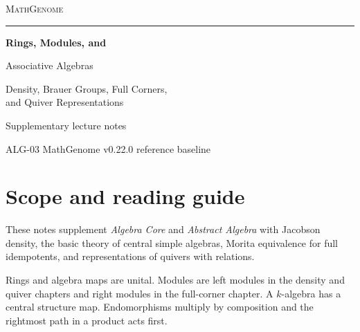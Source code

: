 \documentclass[11pt,oneside,openany]{book}
\theoremstyle{definition}
\theoremstyle{remark}
\begin{document}
\frontmatter
\hypersetup{pageanchor=false}
\begin{titlepage}
  \thispagestyle{empty}
  \begin{flushleft}
    \vspace*{0.65in}
    {\large\scshape\color{deepgreen}MathGenome\par}
    \vspace{0.32in}
    {\color{rulegreen}\rule{0.94\textwidth}{0.65pt}\par}
    \vspace{0.45in}
    {\color{ink}\fontsize{34}{39}\selectfont\bfseries
       Rings, Modules, and\par Associative Algebras\par}
    \vspace{0.30in}
    {\color{deepgreen}\Large
       Density, Brauer Groups, Full Corners,\\[3pt]
       and Quiver Representations\par}
    \vfill
    {\large Supplementary lecture notes\par}
    \vspace{0.12in}
    {\normalsize ALG-03 \enspace\textperiodcentered\enspace MathGenome v0.22.0 reference baseline\par}
    \vspace*{0.48in}
  \end{flushleft}
\end{titlepage}
\hypersetup{pageanchor=true}
{\small\tableofcontents}
\chapter*{Scope and reading guide}

These notes supplement \emph{Algebra Core} and \emph{Abstract Algebra}
\cite{p103,d07} with Jacobson density, the basic theory of central simple
algebras, Morita equivalence for full idempotents, and representations
of quivers with relations.

Rings and algebra maps are unital. Modules are left modules in the
density and quiver chapters and right modules in the full-corner chapter.
A \(k\)-algebra has a central structure map. Endomorphisms multiply by
composition and the rightmost path in a product acts first.

{\setlength{\fboxsep}{0.8em}\setlength{\fboxrule}{0.35pt}%
\noindent{}\par}
\end{document}
